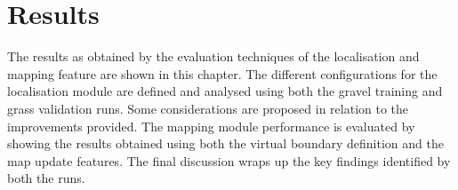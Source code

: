 \chapter{Results}
\label{ch:results}


\noindent
The results as obtained by the evaluation techniques of the localisation and mapping feature are shown in this chapter.
The different configurations for the localisation module are defined and analysed using both the gravel training and grass validation runs.
Some considerations are proposed in relation to the improvements provided.
The mapping module performance is evaluated by showing the results obtained using both the virtual boundary definition and the map update features.
The final discussion wraps up the key findings identified by both the runs.


